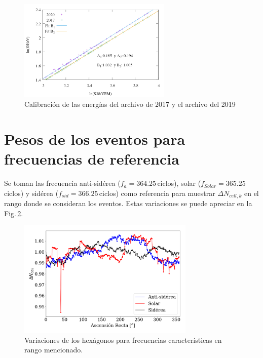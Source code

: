         \begin{figure}[H]
          \centering
          \includegraphics[width=0.65\textwidth]{../0_Introduccion/comparacion_reconstruccion.png}
          \caption{Calibración de las energías del archivo de 2017 y el archivo del 2019}
          \label{fig:calibracionE}
        \end{figure}
	
\section{Pesos de los eventos para frecuencias de referencia}


	Se toman las frecuencia anti-sidérea ($f_a=364.25\,$ciclos), solar ($f_{Solar}= 365.25\,$ciclos) y sidérea ($f_{sid}= 366.25\,$ciclos) como referencia para muestrar $\Delta N_{cell,k}$ en el rango donde se consideran los eventos. Estas variaciones se puede apreciar en la Fig.\,\ref{pesos_bin_1_2}.
			 
			\begin{figure}[H]
				\centering
				\includegraphics[width=0.75\textwidth]{weights_2013_2020.png}
				\caption{Variaciones de los hexágonos para frecuencias características en rango mencionado. }
				\label{pesos_bin_1_2}
			\end{figure}


